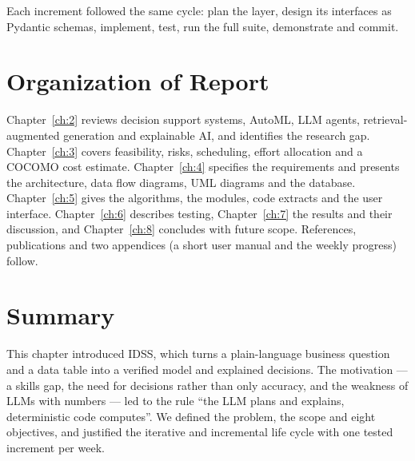 Each increment followed the same cycle: plan the layer, design its interfaces as Pydantic schemas, implement, test, run the full suite, demonstrate and commit.

\FloatBarrier
\section{Organization of Report}\label{sec:1.5}

Chapter~\ref{ch:2} reviews decision support systems, AutoML, LLM agents, retrieval-augmented generation and explainable AI, and identifies the research gap. Chapter~\ref{ch:3} covers feasibility, risks, scheduling, effort allocation and a COCOMO cost estimate. Chapter~\ref{ch:4} specifies the requirements and presents the architecture, data flow diagrams, UML diagrams and the database. Chapter~\ref{ch:5} gives the algorithms, the modules, code extracts and the user interface. Chapter~\ref{ch:6} describes testing, Chapter~\ref{ch:7} the results and their discussion, and Chapter~\ref{ch:8} concludes with future scope. References, publications and two appendices (a short user manual and the weekly progress) follow.

\FloatBarrier
\section{Summary}\label{sec:1.6}

This chapter introduced IDSS, which turns a plain-language business question and a data table into a verified model and explained decisions. The motivation --- a skills gap, the need for decisions rather than only accuracy, and the weakness of LLMs with numbers --- led to the rule ``the LLM plans and explains, deterministic code computes''. We defined the problem, the scope and eight objectives, and justified the iterative and incremental life cycle with one tested increment per week.
